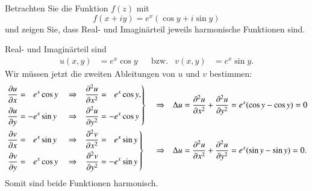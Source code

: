 Betrachten Sie die Funktion $f(z)$ mit
\[
f(x+iy)
=
e^x(\cos y + i\sin y)
\]
und zeigen Sie, dass Real- und Imaginärteil jeweils harmonische Funktionen
sind.

\begin{loesung}
Real- und Imaginärteil sind
\begin{align*}
u(x,y) &= e^x\cos y
&&\text{bzw.} &
v(x,y) &= e^x\sin y.
\end{align*}
Wir müssen jetzt die zweiten Ableitungen von $u$ und $v$ bestimmen:
\begin{align*}
&
\left.
\begin{aligned}
\frac{\partial u}{\partial x} &= \phantom{-}e^x\cos y
&&\Rightarrow&
\frac{\partial^2 u}{\partial x^2} &= \phantom{-}e^x\cos y,
\\
\frac{\partial u}{\partial y} &= -e^x \sin y
&&\Rightarrow&
\frac{\partial^2 u}{\partial y^2} &= -e^x \cos y
\end{aligned}
\right\}
&&\Rightarrow&
\Delta u
&=
\frac{\partial^2u}{\partial x^2}
+
\frac{\partial^2u}{\partial y^2}
=
e^x(\cos y - \cos y)
=
0
\\
&
\left.
\begin{aligned}
\frac{\partial v}{\partial x} &= \phantom{-}e^x \sin y
&&\Rightarrow&
\frac{\partial^2 v}{\partial x^2} &= \phantom{-}e^x\, \rlap{$\sin y$}\phantom{\cos y}
\\
\frac{\partial v}{\partial y} &= \phantom{-}e^x \cos y
&&\Rightarrow&
\frac{\partial^2 v}{\partial y^2} &= -e^x\, \rlap{$\sin y$}\phantom{\cos y}
\end{aligned}
\right\}
&&\Rightarrow&
\Delta u
&=
\frac{\partial^2u}{\partial x^2}
+
\frac{\partial^2u}{\partial y^2}
=
e^x(\sin y - \sin y)
=
0.
\end{align*}
Somit sind beide Funktionen harmonisch.
\end{loesung}
